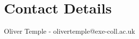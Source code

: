 \documentclass[a1,portrait]{a1poster}
\begin{document}
\begin{multicols}{2}
\color{Black} %




\begin{small}%
\begin{multicols}{2}%
\nocite{*} %
\end{multicols}
\end{small}



\section*{Contact Details}
Oliver Temple - olivertemple@exe-coll.ac.uk
\end{multicols}
\end{document}
